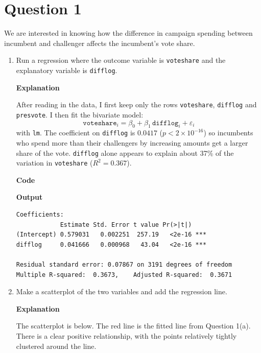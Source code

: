 \documentclass[12pt,letterpaper]{article}
\begin{document}
\section*{Question 1}
\vspace{.25cm}
\noindent We are interested in knowing how the difference in campaign spending between incumbent and challenger affects the incumbent's vote share. 
	\begin{enumerate}
		\item Run a regression where the outcome variable is \texttt{voteshare} and the explanatory variable is \texttt{difflog}.	\vspace{.5cm}

		\textbf{Explanation}
		\vspace{.5cm}

		After reading in the data, I first keep only the rows \texttt{voteshare}, \texttt{difflog} and \texttt{presvote}. I then fit the bivariate model:
		\[
		\texttt{voteshare}_i = \beta_0 + \beta_1\,\texttt{difflog}_i + \varepsilon_i
		\]
		with \texttt{lm}. The coefficient on \texttt{difflog} is $0.0417$ ($p < 2\times10^{-16}$) so incumbents who spend more than their challengers by increasing amounts get a larger share of the vote. \texttt{difflog} alone appears to explain about 37\% of the variation in \texttt{voteshare} ($R^2 = 0.367$).
		\vspace{1cm}

		\textbf{Code}
		
		\vspace{1cm}
		\textbf{Output}
		\begin{verbatim}
Coefficients:
            Estimate Std. Error t value Pr(>|t|)    
(Intercept) 0.579031   0.002251  257.19   <2e-16 ***
difflog     0.041666   0.000968   43.04   <2e-16 ***

Residual standard error: 0.07867 on 3191 degrees of freedom
Multiple R-squared:  0.3673,	Adjusted R-squared:  0.3671
		\end{verbatim}

		\item Make a scatterplot of the two variables and add the regression line. 	\vspace{.5cm}

		\textbf{Explanation}
		\vspace{.5cm}

		The scatterplot is below. The red line is the fitted line from Question 1(a). There is a clear positive relationship, with the points relatively tightly clustered around the line.
		\vspace{1cm}


\end{enumerate}
\end{document}
